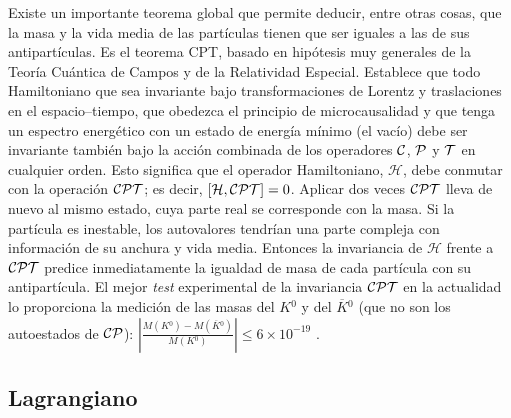 Existe un importante teorema global que permite deducir, entre otras cosas, que la masa y la vida media de las partículas tienen que ser iguales a las de sus  antipartículas. Es el teorema CPT, basado en hipótesis muy generales de la Teoría  Cuántica de Campos y de la Relatividad Especial. Establece que todo  Hamiltoniano que sea  invariante bajo transformaciones de  Lorentz y traslaciones en el espacio--tiempo, que obedezca el principio de  microcausalidad y que tenga un espectro energético con un estado de energía mínimo (el vacío) debe ser  invariante también bajo la acción combinada de los operadores $\mathcal{C}$, $\mathcal{P}$ y $\mathcal{T}$ en cualquier orden. Esto significa que el operador  Hamiltoniano, $\mathcal{ H}$, debe  conmutar con la operación $\mathcal{CP}\mathcal{T}$; es decir, $[\mathcal{ H},\mathcal{CP}\mathcal{T}] = 0$.
Aplicar dos veces $\mathcal{CP}\mathcal{T}$ lleva de nuevo al mismo estado, cuya parte real se corresponde con la masa. Si la partícula es inestable, los autovalores tendrían una parte compleja con información de su anchura y vida media. 
Entonces la  invariancia de $\mathcal{ H}$ frente a $\mathcal{CP}\mathcal{T}$  predice inmediatamente la igualdad de masa de cada partícula con su  antipartícula.
El mejor \textit{test} experimental de la  invariancia $\mathcal{CP}\mathcal{T}$ en la actualidad lo proporciona la medición de las masas del $ K{}^0$ y del $\overline{ K}{}^0$ (que no son los  autoestados de $\mathcal{CP}$): $\left|\frac{ M( K{}^0) -  M(\overline{K}{}^0)}{ M( K{}^0)} \right| \leq 6 \times 10^{-19}$ \cite{pdg2018}.



\color{norm}

\subsection{Lagrangiano} %
\label{sec_yukawa}

